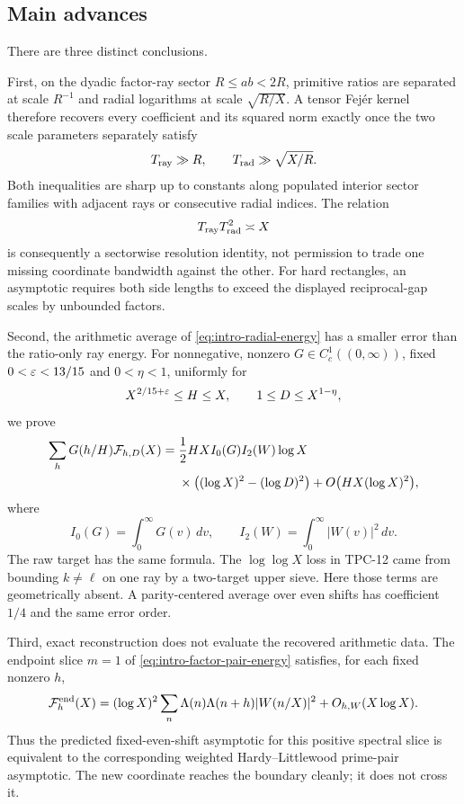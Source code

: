 \subsection{Main advances}

There are three distinct conclusions.

First, on the dyadic factor-ray sector $R\leq ab<2R$, primitive ratios
are separated at scale $R^{-1}$ and radial logarithms at scale
$\sqrt{R/X}$.  A tensor Fej\'er kernel therefore recovers every
coefficient and its squared norm exactly once the two scale parameters
separately satisfy
\[
 T_{\rm ray}\gg R,
 \qquad
 T_{\rm rad}\gg\sqrt{X/R}.
\]
Both inequalities are sharp up to constants along populated interior
sector families with adjacent rays or consecutive radial indices.  The relation
\[
 T_{\rm ray}T_{\rm rad}^2\asymp X
\]
is consequently a sectorwise resolution identity, not permission to
trade one missing coordinate bandwidth against the other.
For hard rectangles, an asymptotic requires both side lengths to exceed
the displayed reciprocal-gap scales by unbounded factors.

Second, the arithmetic average of \eqref{eq:intro-radial-energy} has a
smaller error than the ratio-only ray energy.  For nonnegative, nonzero
$G\in C_c^1((0,\infty))$, fixed $0<\varepsilon<13/15$ and $0<\eta<1$, uniformly
for
\begin{equation}
 X^{2/15+\varepsilon}\leq H\leq X,
 \qquad 1\leq D\leq X^{1-\eta},
 \label{eq:intro-parameter-range}
\end{equation}
we prove
\begin{equation}
 \begin{aligned}
 \sum_hG(h/H)\mathcal F_{h,D}(X)
 ={}&\frac12HX I_0(G)I_2(W)\log X\\
 &\times\bigl((\log X)^2-(\log D)^2\bigr)
 +O\bigl(HX(\log X)^2\bigr),
 \end{aligned}
 \label{eq:intro-main-energy}
\end{equation}
where
\[
 I_0(G)=\int_0^\infty G(v)\,dv,
 \qquad
 I_2(W)=\int_0^\infty|W(v)|^2\,dv.
\]
The raw target has the same formula.  The $\log\log X$ loss in TPC-12
came from bounding $k\ne\ell$ on one ray by a two-target upper sieve.
Here those terms are geometrically absent.  A parity-centered average
over even shifts has coefficient $1/4$ and the same error order.

Third, exact reconstruction does not evaluate the recovered arithmetic
data.  The endpoint slice $m=1$ of \eqref{eq:intro-factor-pair-energy}
satisfies, for each fixed nonzero $h$,
\begin{equation}
 \mathcal F_h^{\rm end}(X)
 =(\log X)^2
 \sum_n\Lambda(n)\Lambda(n+h)|W(n/X)|^2
 +O_{h,W}(X\log X).
 \label{eq:intro-endpoint-reduction}
\end{equation}
Thus the predicted fixed-even-shift asymptotic for this positive spectral
slice is equivalent to the corresponding weighted Hardy--Littlewood
prime-pair asymptotic.  The new coordinate reaches the boundary cleanly;
it does not cross it.

